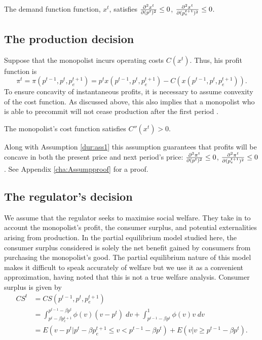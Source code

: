 \begin{ass} \label{dur:ass1}
  The demand function function, $x^t$,
  satisfies $\frac{\partial^2 x^t}{\partial (p^t)^2} \leq 0$, $\frac{\partial^2 x^t}{\partial (p^{t+1}_e)^2} \leq
  0$.
\end{ass}

\subsection{The production decision}

\label{sec:production-decision}

Suppose that the monopolist incurs operating costs $C(x^{t})$. Thus, his
profit function is 
\begin{equation}
\pi ^{t}=\pi
(p^{t-1},p^{t},p_{e}^{t+1})=p^{t}x(p^{t-1},p^{t},p_{e}^{t+1})-C\left(
x(p^{t-1},p^{t},p_{e}^{t+1})\right) .  \label{dur:profit}
\end{equation}%
To ensure concavity of instantaneous profits, it is necessary to assume
convexity of the cost function. As discussed above, this also implies that a
monopolist who is able to precommit will not cease production after the
first period \citep{Kahn1986}. 
\begin{ass} \label{dur:ass2}
The monopolist's cost function satisfies  $C''(x^t) > 0$.
\end{ass}Along with Assumption \ref{dur:ass1} this assumption guarantees
that profits will be concave in both the present price and next period's
price: $\frac{\partial^2 \pi^t}{\partial (p^t)^2}\leq 0$, $\frac{\partial^2 \pi^t}{\partial (p^{t+1}_e)^2}\leq 0$. See
Appendix \ref{cha:Assumpproof} for a proof.

\subsection{The regulator's decision}

\label{sec:regulators-decision}

We assume that the regulator seeks to maximise social welfare. They take in
to account the monopolist's profit, the consumer surplus, and potential
externalities arising from production. In the partial equilibrium model
studied here, the consumer surplus considered is solely the net benefit
gained by consumers from purchasing the monopolist's good. The partial
equilibrium nature of this model makes it difficult to speak accurately of
welfare but we use it as a convenient approximation, having noted that this
is not a true welfare analysis. Consumer surplus is given by 
\begin{align}
CS^{t}& =CS(p^{t-1},p^{t},p_{e}^{t+1}) \\
& =\int_{p^{t}-\beta p_{e}^{t+1}}^{p^{t-1}-\beta p^{t}}\phi
(v)(v-p^{t})\;dv+\int_{p^{t-1}-\beta p^{t}}^{1}\phi (v)v\;dv  \label{eq:8} \\
& =E(v-p^{t}|p^{t}-\beta p_{e}^{t+1}\leq v<p^{t-1}-\beta p^{t})+E(v|v\geq
p^{t-1}-\beta p^{t}).
\end{align}

